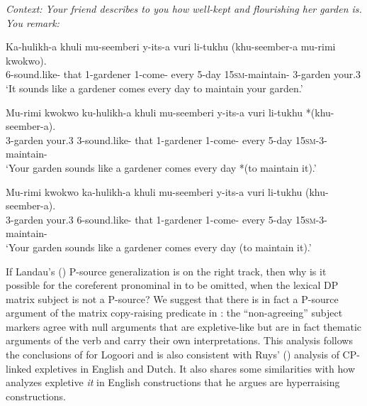\documentclass[output=paper,colorlinks,citecolor=brown
]{langscibook}
\begin{document}
\ea \textit{Context: Your friend describes to you how well-kept and flourishing her garden is. You remark:} \label{ex:johnson:HearAboutGardenSubject2}
\begin{xlist}

\ex \label{ex:johnson:HearAboutGardenUnraised2}
\gll Ka-hulikh-a khuli mu-seemberi y-its-a vuri li-tukhu (khu-seember-a mu-rimi kwokwo).\\
6\Sm-sound.like-\Fv{} that 1-gardener 1\Sm-come-\Fv{} every 5-day \phantom{(}15\textsc{sm}-maintain-\Fv{} 3-garden your.3 \\
\glt `It sounds like a gardener comes every day to maintain your garden.'

\ex \label{ex:johnson:HearAboutGardenNonPsourceSubj}
\gll Mu-rimi kwokwo ku-hulikh-a khuli mu-seemberi y-its-a vuri li-tukhu *(khu-seember-a).\\
3-garden your.3 3\Sm-sound.like-\Fv{} that 1-gardener 1\Sm-come-\Fv{} every 5-day \phantom{*(}15\textsc{sm}-3\Om-maintain-\Fv{}  \\
\glt `Your garden sounds like a gardener comes every day *(to maintain it).'

 

\ex \label{ex:johnson:HearAboutGardenNonPsourceSubjNonAgr}
\gll Mu-rimi kwokwo ka-hulikh-a khuli mu-seemberi y-its-a vuri li-tukhu (khu-seember-a).\\
3-garden your.3 6\Sm-sound.like-\Fv{} that 1-gardener 1\Sm-come-\Fv{} every 5-day \phantom{(}15\textsc{sm}-3\Om-maintain-\Fv{}  \\
\glt `Your garden sounds like a gardener comes every day (to maintain it).'

\end{xlist}
\z 

If Landau's (\citeyear{Landau:2011:CopyRaising}) P-source generalization is on the right track, then why is it possible for the coreferent pronominal in  to be omitted, when the lexical DP matrix subject is not a P-source? We suggest that there is in fact a P-source argument of the matrix copy-raising predicate in : the ``non-agreeing'' subject markers agree with null arguments that are expletive-like but are in fact thematic arguments of the verb and carry their own interpretations. This analysis follows the conclusions of \citet{GluckmanBowler:2017:LogooriExpletives} for Logoori and is also consistent with Ruys' (\citeyear{Ruys:2010:Expletives}) analysis of CP-linked expletives in English and Dutch. It also shares some similarities with how \citet{Greeson2023EnglishHr} analyzes expletive \textit{it} in English constructions that he argues are hyperraising constructions.  
\end{document}
